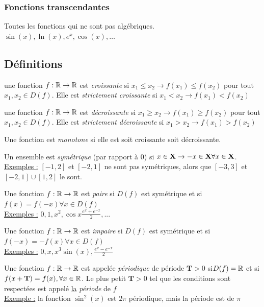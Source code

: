 \documentclass[12pt,a4paper]{article}
\begin{document}
{\subsubsection{Fonctions transcendantes}
Toutes les fonctions qui ne sont pas algébriques.\\
 $\sin(x), \ln(x), e^x, \cos(x), \ldots$

\subsection{Définitions}
\begin{boite}
 une fonction $f:\mathbb{R} \to \mathbb{R}$ est \textit{croissante} si $x_1 \leq x_2 \to f(x_1) \leq f(x_2)$ pour tout $x_1,x_2 \in D(f)$. Elle est \textit{strictement croissante} si $x_1 < x_2 \to f(x_1) < f(x_2)$ 
\end{boite}
\begin{boite}
une fonction $f:\mathbb{R} \to \mathbb{R}$ est \textit{décroissante} si $x_1 \geq x_2 \to f(x_1) \geq f(x_2)$ pour tout $x_1,x_2 \in D(f)$. Elle est \textit{strictement décroissante} si $x_1 > x_2 \to f(x_1) > f(x_2)$ 
\end{boite}
\begin{boite}
 Une fonction est \textit{monotone} si elle est soit croissante soit décroissante.
\end{boite}
\begin{boite}
 Un ensemble est \textit{symétrique} (par rapport à 0) si $x \in \mathbf{X} \to -x \in \mathbf{X} \forall x \in \mathbf{X}$.\\
\underline{Exemples :} $[-1,2]$ et $[-2,1]$ ne sont pas symétriques, alors que $[-3,3]$ et $[-2,1]\cup[1,2]$ le sont.
\end{boite}
\begin{boite}
 Une fonction $f:\mathbb{R} \to \mathbb{R}$ est \textit{paire} si $D(f)$ est symétrique et si $f(x) = f(-x) \forall x \in D(f)$\\
\underline{Exemples :}	$0,1,x^2, \cos{x}\frac{e^x+e^{-x}}{2},...$
\end{boite}
\begin{boite}
 Une fonction $f:\mathbb{R} \to \mathbb{R}$ est \textit{impaire} si $D(f)$ est symétrique et si $f(-x) =-f(x) \forall x \in D(f)$\\
\underline{Exemples :} $0,x,x^3\sin(x), \frac{e^x-e^{-x}}{2} $
\end{boite}
\begin{boite}
 Une fonction $f:\mathbb{R} \to \mathbb{R}$ est appelée \textit{périodique} de période $\mathbf{T} > 0$ si$D(f) = \mathbb{R}$ et si $f(x+\mathbf{T}) = f(x), \forall x \in \mathbb{R}$. Le plus petit $\mathbf{T} > 0$ tel que les conditions sont respectées est appelé \underline{la} \textit{période} de $f$\\
\underline{Exemple :} la fonction $\sin^2(x)$ est $2\pi$ périodique, mais la période est de $\pi$
\end{boite}
}
\end{document}
